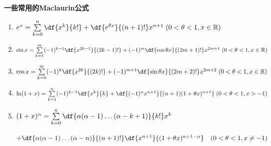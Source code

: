 \begin{thx}
	{\bf 一些常用的Maclaurin公式}
	\begin{enumerate}[(1)]
	  \item $e^x =\sum\limits_{k=0}^n\df{x^k}{k!}
	  +\df{e^{\theta x}}{(n+1)!}x^{n+1}\;
	  (0<\theta<1,x\in\mathbb{R})$
	  \item $\sin x
	  =\sum\limits_{k=1}^m(-1)^{k-1}\df{x^{2k-1}}{(2k-1)!} 
	  +(-1)^m\df{\cos\theta x}{(2m+1)!}x^{2m+1}\;
	  (0<\theta<1,x\in\mathbb{R})$
	  \item $\cos x= \sum\limits_{k=0}^m(-1)^{k}\df{x^{2k}}{(2k)!}
	  +(-1)^{m+1}\df{\sin\theta
	  x}{(2m+2)!}x^{2m+2}\; (0<\theta<1,x\in\mathbb{R})$
	  \item
	  $\ln(1+x) =\sum\limits_{k=1}^n(-1)^{k-1}\df{x^k}{k}
	  +\df{(-1)^nx^{n+1}}{(n+1)(1+\theta
	  x)^{n+1}}\; (0<\theta<1,x>-1)$
	  \item
	  $(1+x)^\alpha =\sum\limits_{k=0}^n
	  \df{\alpha(\alpha-1)\ldots(\alpha-k+1)}{k!}x^k$

		\hspace{2cm}$+\df{\alpha(\alpha-1)\ldots(\alpha-n)}{(n+1)!}\df{x^{n+1}}{(1+\theta
		x)^{n+1-\alpha}}\quad (0<\theta<1,x\ne -1)$
	\end{enumerate}
\end{thx}

